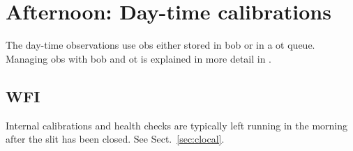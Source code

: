 \documentclass[11pt,fleqn,a4paper]{book}
\begin{document}
\chapter{Afternoon: Day-time calibrations}
\label{chap:daycal}

The day-time observations use \glspl{ob} either stored in \gls{bob} or in a
\gls{ot} queue.  Managing \glspl{ob} with \gls{bob} and \gls{ot} is
explained in more detail in .

\section{WFI}
Internal calibrations and health checks are typically left running in the morning after the \gls{slit} has been closed.  See Sect.~\ref{sec:clocal}.

\end{document}
